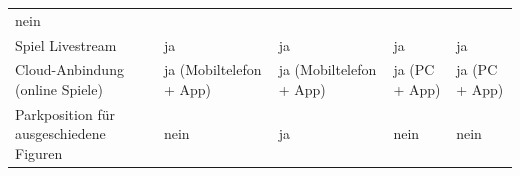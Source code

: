 \begin{longtable}[]{@{}lllll@{}}
\begin{minipage}[t]{0.13\columnwidth}
nein\strut
\end{minipage}\tabularnewline
\begin{minipage}[t]{0.19\columnwidth}\raggedright
Spiel Livestream\strut
\end{minipage} & \begin{minipage}[t]{0.19\columnwidth}\raggedright
ja\strut
\end{minipage} & \begin{minipage}[t]{0.20\columnwidth}\raggedright
ja\strut
\end{minipage} & \begin{minipage}[t]{0.15\columnwidth}\raggedright
ja\strut
\end{minipage} & \begin{minipage}[t]{0.13\columnwidth}\raggedright
ja\strut
\end{minipage}\tabularnewline
\begin{minipage}[t]{0.19\columnwidth}\raggedright
Cloud-Anbindung (online Spiele)\strut
\end{minipage} & \begin{minipage}[t]{0.19\columnwidth}\raggedright
ja (Mobiltelefon + App)\strut
\end{minipage} & \begin{minipage}[t]{0.20\columnwidth}\raggedright
ja (Mobiltelefon + App)\strut
\end{minipage} & \begin{minipage}[t]{0.15\columnwidth}\raggedright
ja (PC + App)\strut
\end{minipage} & \begin{minipage}[t]{0.13\columnwidth}\raggedright
ja (PC + App)\strut
\end{minipage}\tabularnewline
\begin{minipage}[t]{0.19\columnwidth}\raggedright
Parkposition für ausgeschiedene Figuren\strut
\end{minipage} & \begin{minipage}[t]{0.19\columnwidth}\raggedright
nein\strut
\end{minipage} & \begin{minipage}[t]{0.20\columnwidth}\raggedright
ja\strut
\end{minipage} & \begin{minipage}[t]{0.15\columnwidth}\raggedright
nein\strut
\end{minipage} & \begin{minipage}[t]{0.13\columnwidth}\raggedright
nein\strut
\end{minipage}\tabularnewline

\end{longtable}
